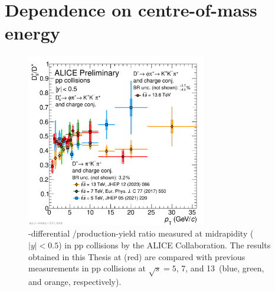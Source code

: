 \section{Dependence on centre-of-mass energy}
\begin{figure}[htb]
    \centering
    \includegraphics[width=0.7\textwidth]{Figures/Chapter 7/dsoverdpluscomparisonalice_0.pdf}
    \caption{\pt-differential \ds/\dpl production-yield ratio measured at midrapidity ($\lvert y\rvert<0.5$) in pp collisions by the ALICE Collaboration. The results obtained in this Thesis at \thirteen (red) are compared with previous measurements in pp collisions at $\sqrt{s} = 5$, 7, and 13~\tev (blue, green, and orange, respectively).}
    \label{fig:dsdplvsenergy}
\end{figure}

